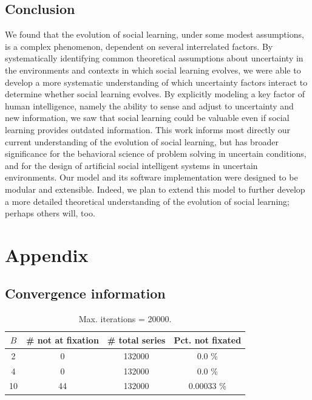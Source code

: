 \documentclass[letterpaper,11.5pt]{scrartcl}
\begin{document}
\subsection{Conclusion}

We found that the evolution of social learning, under some modest
assumptions, is a complex phenomenon, dependent on several interrelated factors. By systematically
identifying common theoretical assumptions about uncertainty in the environments and contexts
in which social learning evolves, we were able to develop a more systematic understanding of
which uncertainty factors interact to determine whether social learning evolves. By
explicitly modeling a key factor of human intelligence, namely the ability to sense and
adjust to uncertainty and new information, we saw that social learning could be
valuable even if social learning provides outdated information. This work
informs most directly our current understanding of the evolution of social learning, but has
broader significance for the behavioral science of problem solving in uncertain conditions, and
for the design of artificial social intelligent systems in uncertain environments.  Our model
and its software implementation were designed to be modular and extensible.  Indeed,
we plan to extend this model to further develop a more detailed theoretical understanding of
the evolution of social learning; perhaps others will, too.



% 



\appendix


\section{Appendix}

\subsection{Convergence information}

\begin{table}[h] \caption{Max. iterations = 20000.} \label{tab:convergence} \centering
  \begin{tabular}{cccc} \toprule $B$ & \# not at fixation & \# total series & Pct. not fixated
    \\ \midrule  2  & 0  & 132000 & 0.0 \% \\ 4  & 0  & 132000 & 0.0 \% \\ 10 & 44 & 132000 &
    0.00033  \% \\ \bottomrule \end{tabular} \end{table}
\end{document}

